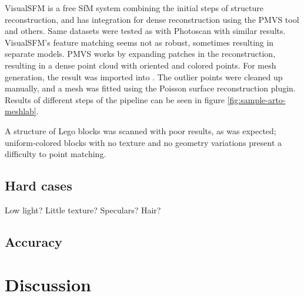VisualSFM \cite{visualsfm} is a free SfM system combining the initial steps of structure reconstruction, and has integration for dense reconstruction using the PMVS \cite{pmvs} tool and others.
Same datasets were tested as with Photoscan with similar results.
VisualSFM's feature matching seems not as robust, sometimes resulting in separate models.
PMVS \cite{pmvs} works by expanding patches in the reconstruction, resulting in a dense point cloud with oriented and colored points.
For mesh generation, the result was imported into \cite{Meshlab}.
The outlier points were cleaned up manually, and a mesh was fitted using the Poisson surface reconstruction plugin.
Results of different steps of the pipeline can be seen in figure \ref{fig:sample-arto-meshlab}.


A structure of Lego blocks was scanned with poor results, as was expected; uniform-colored blocks with no texture and no geometry variations present a difficulty to point matching.


\subsection{Hard cases}

Low light? Little texture? Speculars? Hair?


\subsection{Accuracy}

\clearpage

\section{Discussion}






